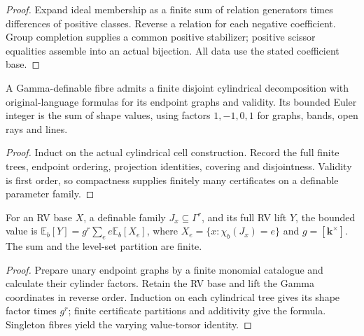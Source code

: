 \begin{proof}
Expand ideal membership as a finite sum of relation generators times differences of positive classes. Reverse a relation for each negative coefficient. Group completion supplies a common positive stabilizer; positive scissor equalities assemble into an actual bijection. All data use the stated coefficient base.
\end{proof}

\begin{lemma}
\label{euler}
\leanok
{}
A Gamma-definable fibre admits a finite disjoint cylindrical decomposition with original-language formulas for its endpoint graphs and validity. Its bounded Euler integer is the sum of shape values, using factors $1,-1,0,1$ for graphs, bands, open rays and lines.
\end{lemma}

\begin{proof}
Induct on the actual cylindrical cell construction. Record the full finite trees, endpoint ordering, projection identities, covering and disjointness. Validity is first order, so compactness supplies finitely many certificates on a definable parameter family.
\end{proof}

\begin{lemma}
\label{relative-gamma}
\leanok
{}
For an RV base $X$, a definable family $J_x\subseteq\Gamma^r$, and its full RV lift $Y$, the bounded value is $\mathbb E_b[Y]=g^r\sum_e e\mathbb E_b[X_e]$, where $X_e=\{x:\chi_b(J_x)=e\}$ and $g=[\mathbf k^\times]$. The sum and the level-set partition are finite.
\end{lemma}

\begin{proof}
Prepare unary endpoint graphs by a finite monomial catalogue and calculate their cylinder factors. Retain the RV base and lift the Gamma coordinates in reverse order. Induction on each cylindrical tree gives its shape factor times $g^r$; finite certificate partitions and additivity give the formula. Singleton fibres yield the varying value-torsor identity.
\end{proof}

